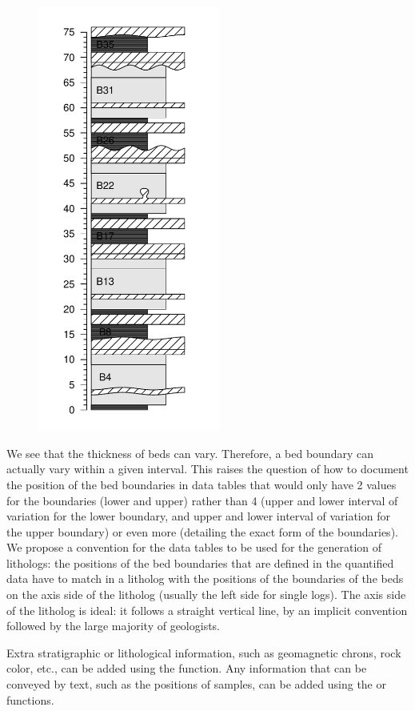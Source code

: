 \begin{figure}[H]
	\centering
	\includegraphics[width=60mm]{boundary.log}
\end{figure}

We see that the thickness of beds can vary. Therefore, a bed boundary can actually vary within a given interval. This raises the question of how to document the position of the bed boundaries in data tables that would only have 2 values for the boundaries (lower and upper) rather than 4 (upper and lower interval of variation for the lower boundary, and upper and lower interval of variation for the upper boundary) or even more (detailing the exact form of the boundaries). We propose a convention for the data tables to be used for the generation of lithologs: the positions of the bed boundaries that are defined in the quantified data have to match in a litholog with the positions of the boundaries of the beds on the axis side of the litholog (usually the left side for single logs). The axis side of the litholog is ideal: it follows a straight vertical line, by an implicit convention followed by the large majority of geologists.

Extra stratigraphic or lithological information, such as geomagnetic chrons, rock color, etc., can be added using the  function. Any information that can be conveyed by text, such as the positions of samples, can be added using the  or  functions.

